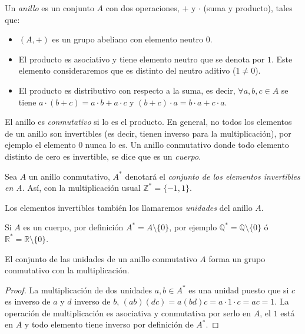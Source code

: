 \begin{definition}
	Un \textit{anillo} es un conjunto $A$ con dos operaciones, $+$ y $\cdot$ (suma y producto), tales que:
	\begin{itemize}
		\item $(A,+)$ es un grupo abeliano con elemento neutro $0$.
		\item El producto es asociativo y tiene elemento neutro que
se denota por $1$. Este elemento consideraremos que es distinto del neutro aditivo ($1\neq 0$).
		\item El producto es distributivo con respecto a la suma, es decir,
$\forall a,b,c \in A$ se tiene $a\cdot(b+c)=a\cdot b + a\cdot c$ y $(b+c)\cdot a = b\cdot a + c\cdot a$.
	\end{itemize}

El anillo es \textit{conmutativo} si lo es el producto. En general, no todos los
elementos de un anillo son invertibles (es decir, tienen inverso para la multiplicaci\'on),
por ejemplo el elemento $0$ nunca lo es. Un anillo conmutativo donde todo elemento
distinto de cero es invertible, se dice que es un \textit{cuerpo}.
\end{definition}

\begin{definition}
Sea $A$ un anillo conmutativo, $A^*$ denotará el
{\em conjunto de los elementos invertibles en A}. Así, con la
multiplicación usual $\mathbb{Z}^* = \{-1,1\}$.

Los elementos invertibles tambi\'en los llamaremos {\em unidades} del anillo $A$.

Si $A$ es un cuerpo, por definici\'on $A^* = A \setminus \{0\}$, por ejemplo
${\mathbb Q}^* = {\mathbb Q} \setminus \{0\}$ ó ${\mathbb R}^* = {\mathbb R}\setminus \{0\}$.
\end{definition}

\begin{proposition}
El conjunto de las unidades de un anillo conmutativo $A$ forma un grupo
conmutativo con la multiplicaci\'on.
\end{proposition}
\begin{proof}
La multiplicaci\'on de dos unidades $a,b \in A^*$ es una unidad puesto que
si $c$ es inverso de $a$ y $d$ inverso de $b$, $(ab)(dc) = a(bd)c = a\cdot
1\cdot c = ac = 1$. La operaci\'on de multiplicaci\'on es asociativa y
conmutativa por serlo en $A$, el $1$ est\'a en $A$ y todo elemento tiene inverso por
definici\'on de $A^*$.
\end{proof}

